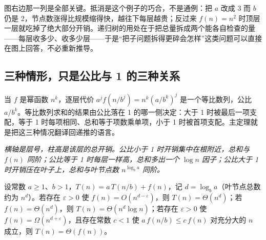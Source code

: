 图右边那一列是全部关键。抵消是这个例子的巧合，不是通例：把 \(a\) 改成 3 而 \(b\) 仍是 2，节点数涨得比规模缩得快，越往下每层越贵；反过来 \(f(n)=n^2\) 时顶层一层就吃掉了绝大部分开销。递归树的用处在于把总量拆成两个能各自检查的量——每层收多少、收多少层——于是``把子问题拆得更碎会怎样''这类问题可以直接在图上回答，不必重新推导。

\subsection{三种情形，只是公比与 1 的三种关系}

当 \(f\) 是幂函数 \(n^{k}\)，逐层代价 \(a^{j}f(n/b^{j})=n^{k}(a/b^{k})^{j}\) 是一个等比数列，公比 \(a/b^{k}\)。等比数列求和的结果由公比落在 1 的哪一侧决定：大于 1 时被最后一项支配，等于 1 时每项相同、总和等于项数乘单项，小于 1 时被首项支配。主定理就是把这三种情况翻译回递推的语言。

\begin{center}

\emph{横轴是层号，柱高是该层的总开销。公比小于 1 时开销集中在根附近，总和与 \(f(n)\) 同阶；公比等于 1 时每层一样高，总和多出一个 \(\log n\) 因子；公比大于 1 时开销压在叶子上，总和与叶节点数 \(n^{\log_b a}\) 同阶。}
\end{center}

\begin{theorem}[主定理]
设常数 \(a\ge1\)、\(b>1\)，\(T(n)=a\,T(n/b)+f(n)\)，记 \(d=\log_b a\)（叶节点总数约为 \(n^{d}\)）。若存在 \(\varepsilon>0\) 使 \(f(n)=O(n^{d-\varepsilon})\)，则 \(T(n)=\Theta(n^{d})\)；若 \(f(n)=\Theta(n^{d})\)，则 \(T(n)=\Theta(n^{d}\log n)\)；若存在 \(\varepsilon>0\) 使 \(f(n)=\Omega(n^{d+\varepsilon})\)，且存在常数 \(c<1\) 使 \(a\,f(n/b)\le c\,f(n)\) 对充分大的 \(n\) 成立，则 \(T(n)=\Theta(f(n))\)。
\end{theorem}

